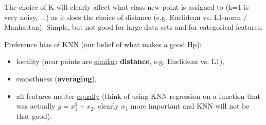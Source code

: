 \documentclass[11pt]{article}
\begin{document}
The choice of K will clearly affect what class new point is assigned to (k=1 is very noisy, ...) as it does the choice of distance (e.g. Euclidean vs. L1-norm / Manhattan). Simple, but not good for large data sets and for categorical features.

Preference bias of KNN (our belief of what makes a good Hp):
\begin{itemize}
	\item locality (near points are \underline{similar}: \textbf{distance}, e.g. Euclidean vs. L1),
	\item smoothness (\textbf{averaging}),
	\item all features matter \underline{equally} (think of using KNN regression on a function that was actually $y=x_1^2 + x_2$, clearly $x_1$ more important and KNN will not be that good).
\end{itemize}
\end{document}
